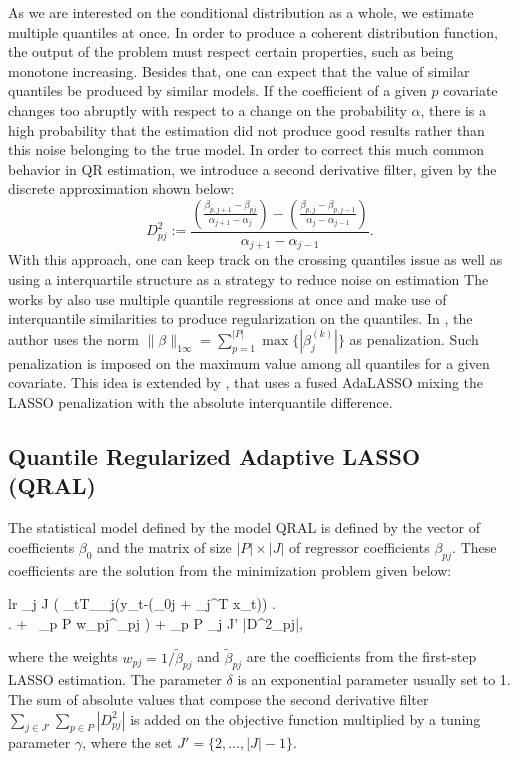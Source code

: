 As we are interested on the conditional distribution as a whole, we estimate multiple quantiles at once. In order to produce a coherent distribution function, the output of the problem must respect certain properties, such as being monotone increasing. 
Besides that, one can expect that the value of similar quantiles be produced by similar models. If the coefficient of a given $p$ covariate changes too abruptly with respect to a change on the probability $\alpha$, there is a high probability that the estimation did not produce good results rather than this noise belonging to the true model.  In order to correct this much common behavior in QR estimation, we introduce a second derivative filter, given by the discrete approximation shown below:
\begin{equation}
D_{pj}^{2}:=\frac{\left(\frac{\beta_{p,j+1}-\beta_{pj}}{\alpha_{j+1}-\alpha_{j}}\right)-\left(\frac{\beta_{p,j}-\beta_{p,j-1}}{\alpha_{j}-\alpha_{j-1}}\right)}{\alpha_{j+1}-\alpha_{j-1}}.
\end{equation}
With this approach, one can keep track on the crossing quantiles issue as well as using a interquartile structure as a strategy to reduce noise on estimation %
The works by \cite{zou_regularized_2008, jiang_interquantile_2014} also use multiple quantile regressions at once and make use of interquantile similarities to produce regularization on the quantiles. In \cite{zou_regularized_2008}, the author uses the norm $\| \beta \|_{1\infty}=\sum_{p=1}^{|P|} \max\{ |\beta_j^{(k)} |\}$ as penalization. Such penalization is imposed on the maximum value among all quantiles for a given covariate. This idea is extended by \cite{jiang_interquantile_2014}, that uses a fused AdaLASSO mixing the LASSO penalization with the absolute interquantile difference.

\subsection{Quantile Regularized Adaptive LASSO (QRAL)}

The statistical model defined by the model QRAL is defined by the vector of coefficients $\beta_{0}$ and the matrix of size $|P| \times |J|$ of regressor coefficients $\beta_{pj}$. These coefficients are the solution from the minimization problem given below:
	\begin{IEEEeqnarray}{lr}
	 \sum_{j \in J} \left( \sum_{t\in T}\rho_{\alpha_j}(y_{t}-(\beta_{0j} + \beta_j^T x_t)) \right.  \span \nonumber \\
	\span \left. + \lambda\  \sum_{p \in P} w_{pj}^\delta \mid  \beta_{pj} \mid \right) + \gamma \sum_{p \in P} \sum_{j \in J'} |D^2_{pj}|,\label{eq:adalasso_model}
\end{IEEEeqnarray}
where the weights $w_{pj} = 1/\tilde{\beta}_{pj}$ and $\tilde \beta_{pj}$ are the coefficients from the first-step LASSO estimation. The parameter $\delta$ is an exponential parameter usually set to 1.
The sum of absolute values that compose the second derivative filter $\sum_{j \in J'}\sum_{p \in P}|D_{pj}^{2}|$ is added on the objective function multiplied by a tuning parameter $\gamma$, where the set $J'=\{2,\dots,|J|-1 \}$.
